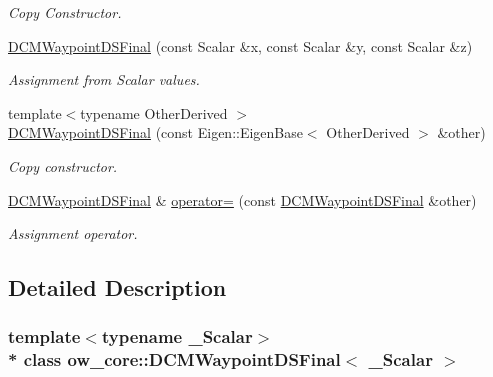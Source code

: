 \begin{DoxyCompactItemize}
\begin{DoxyCompactList}\small\item\em Copy Constructor. \end{DoxyCompactList}\item 
\hyperlink{classow__core_1_1DCMWaypointDSFinal_a80af1076109abafc0054490c62b6c097}{D\+C\+M\+Waypoint\+D\+S\+Final} (const Scalar \&x, const Scalar \&y, const Scalar \&z)\hypertarget{classow__core_1_1DCMWaypointDSFinal_a80af1076109abafc0054490c62b6c097}{}\label{classow__core_1_1DCMWaypointDSFinal_a80af1076109abafc0054490c62b6c097}

\begin{DoxyCompactList}\small\item\em Assignment from Scalar values. \end{DoxyCompactList}\item 
{\footnotesize template$<$typename Other\+Derived $>$ }\\\hyperlink{classow__core_1_1DCMWaypointDSFinal_a578a0153f5cbde247480e9b0e814dd03}{D\+C\+M\+Waypoint\+D\+S\+Final} (const Eigen\+::\+Eigen\+Base$<$ Other\+Derived $>$ \&other)
\begin{DoxyCompactList}\small\item\em Copy constructor. \end{DoxyCompactList}\item 
\hyperlink{classow__core_1_1DCMWaypointDSFinal}{D\+C\+M\+Waypoint\+D\+S\+Final} \& \hyperlink{classow__core_1_1DCMWaypointDSFinal_a6fdf174913f5ece1c523c27ab9313111}{operator=} (const \hyperlink{classow__core_1_1DCMWaypointDSFinal}{D\+C\+M\+Waypoint\+D\+S\+Final} \&other)\hypertarget{classow__core_1_1DCMWaypointDSFinal_a6fdf174913f5ece1c523c27ab9313111}{}\label{classow__core_1_1DCMWaypointDSFinal_a6fdf174913f5ece1c523c27ab9313111}

\begin{DoxyCompactList}\small\item\em Assignment operator. \end{DoxyCompactList}\end{DoxyCompactItemize}


\subsection{Detailed Description}
\subsubsection*{template$<$typename \+\_\+\+Scalar$>$\\*
class ow\+\_\+core\+::\+D\+C\+M\+Waypoint\+D\+S\+Final$<$ \+\_\+\+Scalar $>$}

